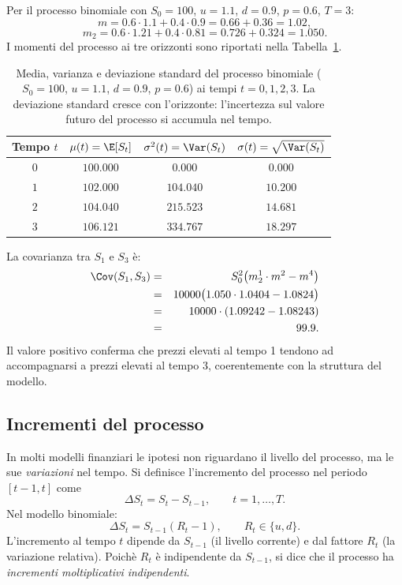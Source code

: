 \begin{example}
\label{es:momenti-binomiale}
Per il processo binomiale con $S_0=100$, $u=1.1$, $d=0.9$, $p=0.6$,
$T=3$:
\[
m=0.6\cdot 1.1+0.4\cdot 0.9=0.66+0.36=1.02,
\]
\[
m_2=0.6\cdot 1.21+0.4\cdot 0.81=0.726+0.324=1.050.
\]
I momenti del processo ai tre orizzonti sono riportati nella
Tabella~\ref{tab:momenti-binomiale}.

\begin{table}[h]
\centering
\begin{tabular}{|c|c|c|c|}
\hline
\textbf{Tempo} $t$ & $\mu(t)=\E[S_t]$ &
$\sigma^2(t)=\Var(S_t)$ & $\sigma(t)=\sqrt{\Var(S_t)}$\\
\hline
$0$ & $100.000$ & $0.000$ & $0.000$\\
$1$ & $102.000$ & $104.040$ & $10.200$\\
$2$ & $104.040$ & $215.523$ & $14.681$\\
$3$ & $106.121$ & $334.767$ & $18.297$\\
\hline
\end{tabular}
\caption{Media, varianza e deviazione standard del processo binomiale
($S_0=100$, $u=1.1$, $d=0.9$, $p=0.6$) ai tempi $t=0,1,2,3$.
La deviazione standard cresce con l'orizzonte: l'incertezza sul
valore futuro del processo si accumula nel tempo.}
\label{tab:momenti-binomiale}
\end{table}

La covarianza tra $S_1$ e $S_3$ \`{e}:
\begin{eqnarray*}
\Cov(S_1,S_3)
&=& S_0^2\bigl(m_2^1\cdot m^{2}-m^{4}\bigr)\\
&=& 10000\bigl(1.050\cdot 1.0404-1.0824\bigr)\\
&=& 10000\cdot(1.09242-1.08243)\\
&=& 99.9.
\end{eqnarray*}
Il valore positivo conferma che prezzi elevati al tempo 1 tendono
ad accompagnarsi a prezzi elevati al tempo 3, coerentemente con la
struttura del modello.
\end{example}

\subsection{Incrementi del processo}

In molti modelli finanziari le ipotesi non riguardano il livello del
processo, ma le sue \emph{variazioni} nel tempo. Si definisce
l'incremento del processo nel periodo $[t-1,t]$ come
\[
\Delta S_t = S_t - S_{t-1}, \qquad t=1,\ldots,T.
\]
Nel modello binomiale:
\[
\Delta S_t = S_{t-1}(R_t - 1), \qquad R_t\in\{u,d\}.
\]
L'incremento al tempo $t$ dipende da $S_{t-1}$ (il livello corrente)
e dal fattore $R_t$ (la variazione relativa). Poich\`{e} $R_t$ \`{e}
indipendente da $S_{t-1}$, si dice che il processo ha
\emph{incrementi moltiplicativi indipendenti}.

